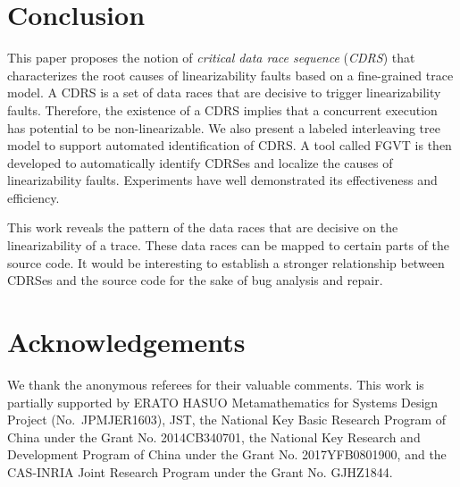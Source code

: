 \documentclass[runningheads]{llncs}
\begin{document}
\section{Conclusion}\label{sec:conclusion}
This paper proposes the notion of \textit{critical data race sequence} (\textit{CDRS}) that characterizes the root causes of linearizability faults based on a fine-grained trace model. A CDRS is a set of data races that are decisive to trigger linearizability faults. Therefore, the existence of a CDRS implies that a concurrent execution has potential to be non-linearizable. We also present a labeled interleaving tree model to support automated identification of CDRS. A tool called FGVT is then developed to automatically identify CDRSes and localize the causes of linearizability faults. Experiments have well demonstrated its effectiveness and efficiency.

This work reveals the pattern of the data races that are decisive on the linearizability of a trace. These data races can be mapped to certain parts of the source code. It would be interesting to establish a stronger relationship between CDRSes and the source code for the sake of bug analysis and repair.

\section*{Acknowledgements}\label{sec:acknowledgement}

We thank the anonymous referees for their valuable comments. This work is partially supported by ERATO HASUO Metamathematics for Systems Design Project (No.~{JPMJER1603}), JST, the National Key Basic Research Program of China under the Grant No. 2014CB340701, the National Key Research and Development Program of China under the Grant No. 2017YFB0801900, and the CAS-INRIA Joint Research Program under the Grant No. GJHZ1844.

%
%
 
 
%
\end{document}
